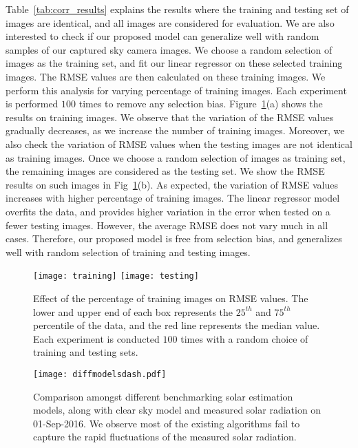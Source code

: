 Table~\ref{tab:corr_results} explains the results where the training and testing set of images are identical, and all images are considered for evaluation. We are also interested to check if our proposed model can generalize well with random samples of our captured sky camera images. We choose a random selection of images as the training set, and fit our linear regressor on these selected training images. The RMSE values are then calculated on these training images. We perform this analysis for varying percentage of training images. Each experiment is performed $100$ times to remove any selection bias. Figure~\ref{fig:train_test}(a) shows the results on training images. We observe that the variation of the RMSE values gradually decreases, as we increase the number of training images. Moreover, we also check the variation of RMSE values when the testing images are not identical as training images. Once we choose a random selection of images as training set, the remaining images are considered as the testing set. We show the RMSE results on such images in Fig~\ref{fig:train_test}(b). As expected, the variation of RMSE values increases with higher percentage of training images. The linear regressor model overfits the data, and provides higher variation in the error when tested on a fewer testing images. However, the average RMSE does not vary much in all cases. Therefore, our proposed model is free from selection bias, and generalizes well with random selection of training and testing images.

\begin{figure}[htb]
\begin{center}
\texttt{[image: training]}
\texttt{[image: testing]}\\
\caption[Effect of the percentage of training and testing images on the RMSE of proposed model.]{Effect of the percentage of training images on RMSE values. The lower and upper end of each box represents the $25^{th}$ and $75^{th}$ percentile of the data, and the red line represents the median value. Each experiment is conducted $100$ times with a random choice of training and testing sets. \label{fig:train_test}}
\end{center}
\end{figure}

\begin{figure}[htb]
\centering
\texttt{[image: diffmodelsdash.pdf]}
\caption[Comparison of several solar estimation models amongst each other.]{Comparison amongst different benchmarking solar estimation models, along with clear sky model and measured solar radiation on 01-Sep-2016. We observe most of the existing algorithms fail to capture the rapid fluctuations of the measured solar radiation. 
\label{fig:othermodels}}
\end{figure}

